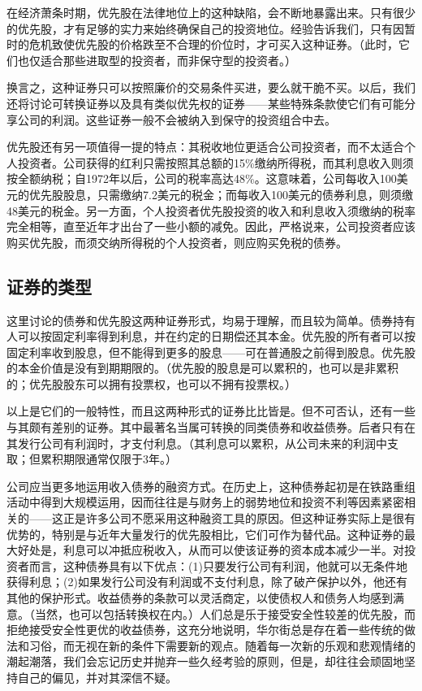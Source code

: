 \documentclass[12pt,oneside]{book}
\begin{document}
在经济萧条时期，优先股在法律地位上的这种缺陷，会不断地暴露出来。只有很少的优先股，才有足够的实力来始终确保自己的投资地位。经验告诉我们，只有因暂时的危机致使优先股的价格跌至不合理的价位时，才可买入这种证券。（此时，它们也仅适合那些进取型的投资者，而非保守型的投资者。）

换言之，这种证券只可以按照廉价的交易条件买进，要么就干脆不买。以后，我们还将讨论可转换证券以及具有类似优先权的证券——某些特殊条款使它们有可能分享公司的利润。这些证券一般不会被纳入到保守的投资组合中去。

优先股还有另一项值得一提的特点：其税收地位更适合公司投资者，而不太适合个人投资者。公司获得的红利只需按照其总额的15\%缴纳所得税，而其利息收入则须按全额纳税；自1972年以后，公司的税率高达48\%。这意味着，公司每收入100美元的优先股股息，只需缴纳7.2美元的税金；而每收入100美元的债券利息，则须缴48美元的税金。另一方面，个人投资者优先股投资的收入和利息收入须缴纳的税率完全相等，直至近年才出台了一些小额的减免。因此，严格说来，公司投资者应该购买优先股，而须交纳所得税的个人投资者，则应购买免税的债券。

\subsection{证券的类型}
这里讨论的债券和优先股这两种证券形式，均易于理解，而且较为简单。债券持有人可以按固定利率得到利息，并在约定的日期偿还其本金。优先股的所有者可以按固定利率收到股息，但不能得到更多的股息——可在普通股之前得到股息。优先股的本金价值是没有到期期限的。（优先股的股息是可以累积的，也可以是非累积的；优先股股东可以拥有投票权，也可以不拥有投票权。）

以上是它们的一般特性，而且这两种形式的证券比比皆是。但不可否认，还有一些与其颇有差别的证券。其中最著名当属可转换的同类债券和收益债券。后者只有在其发行公司有利润时，才支付利息。（其利息可以累积，从公司未来的利润中支取；但累积期限通常仅限于3年。）

公司应当更多地运用收入债券的融资方式。在历史上，这种债券起初是在铁路重组活动中得到大规模运用，因而往往是与财务上的弱势地位和投资不利等因素紧密相关的——这正是许多公司不愿采用这种融资工具的原因。但这种证券实际上是很有优势的，特别是与近年大量发行的优先股相比，它们可作为替代品。这种证券的最大好处是，利息可以冲抵应税收入，从而可以使该证券的资本成本减少一半。对投资者而言，这种债券具有以下优点：(1)只要发行公司有利润，他就可以无条件地获得利息；(2)如果发行公司没有利润或不支付利息，除了破产保护以外，他还有其他的保护形式。收益债券的条款可以灵活商定，以使债权人和债务人均感到满意。（当然，也可以包括转换权在内。）人们总是乐于接受安全性较差的优先股，而拒绝接受安全性更优的收益债券，这充分地说明，华尔街总是存在着一些传统的做法和习俗，而无视在新的条件下需要新的观点。随着每一次新的乐观和悲观情绪的潮起潮落，我们会忘记历史并抛弃一些久经考验的原则，但是，却往往会顽固地坚持自己的偏见，并对其深信不疑。
\end{document}
